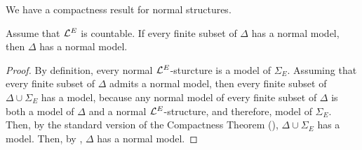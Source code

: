 We have a compactness result for normal structures.

\begin{boxtheorem}\label{Ch2:Thm:Compactness_Normal_Models}
    Assume that $\mathcal{L}^{E}$ is countable. If every finite subset of $\Delta$ has a normal model, then $\Delta$ has a normal model.
\end{boxtheorem}
\begin{proof}
    By definition, every normal $\mathcal{L}^{E}$-sturcture is a model of $\Sigma_E$. Assuming that every finite subset of $\Delta$ admits a normal model, then every finite subset of $\Delta \cup \Sigma_{E}$ has a model, because any normal model of every finite subset of $\Delta$ is both a model of $\Delta$ and a normal $\mathcal{L}^{E}$-structure, and therefore, model of $\Sigma_E$. Then, by the standard version of the Compactness Theorem (), $\Delta \cup \Sigma_E$ has a model. Then, by , $\Delta$ has a normal model.
\end{proof}

\sorry %